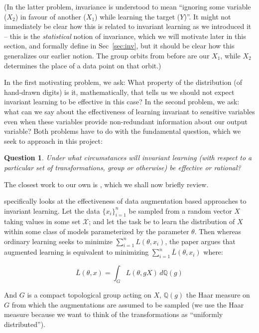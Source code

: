 \documentclass[12pt]{article}
\newtheorem{qn}[thm]{Question}
\theoremstyle{definition}
\numberwithin{equation}{section}
\numberwithin{figure}{section}
\numberwithin{table}{section}
\begin{document}
(In the latter problem, invariance is understood to mean ``ignoring some variable ($X_2$) in favour of another ($X_1$) while learning the target ($Y$)''. It might not immediately be clear how this is related to invariant learning as we introduced it -- this is the \emph{statistical} notion of invariance, which we will motivate later in this section, and formally define in Sec~\ref{sec:inv}, but it should be clear how this generalizes our earlier notion. The group orbits from before are our $X_1$, while $X_2$ determines the place of a data point on that orbit.)

In the first motivating problem, we ask: What property of the distribution (of hand-drawn digits) is it, mathematically, that tells us we should not expect invariant learning to be effective in this case? In the second problem, we ask: what can we say about the effectiveness of learning invariant to sensitive variables even when these variables provide non-redundant information about our output variable? Both problems have to do with the fundamental question, which we seek to approach in this project: 

\begin{qn}
    \label{qn:1}
    Under what circumstances will invariant learning (with respect to a particular set of transformations, group or otherwise) be effective or rational?
\end{qn}

The closest work to our own is \cite{sxchen}, which we shall now briefly review.

\cite{sxchen} specifically looks at the effectiveness of data augmentation based approaches to invariant learning. Let the data $\{x_i\}_{i=1}^n$ be sampled from a random vector $X$ taking values in some set $\mathcal{X}$; and let the task be to learn the distribution of $X$ within some class of models parameterized by the parameter $\theta$. Then whereas ordinary learning seeks to minimize $\sum_{i=1}^n{L(\theta, x_i)}$, the paper argues that augmented learning is equivalent to minimizing $\sum_{i=1}^n{\bar{L}(\theta, x_i)}$ where:

\begin{equation*}
    \bar{L}(\theta, x)=\int_{G}{L(\theta, gX)\,d\mathbb{Q}(g)}
\end{equation*}

And $G$ is a compact topological group acting on $X$, $\mathbb{Q}(g)$ the Haar measure on $G$ from which the augmentations are assumed to be sampled (we use the Haar measure because we want to think of the transformations as ``uniformly distributed'').
\end{document}
